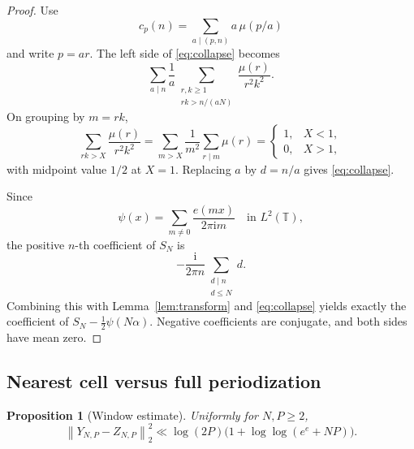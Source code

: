 \documentclass[11pt]{article}
\numberwithin{equation}{section}
\newtheorem{proposition}[theorem]{Proposition}
\theoremstyle{definition}
\newcommand{\T}{\mathbb T}
\newcommand{\1}{\mathbf 1}
\newcommand{\ii}{\mathrm i}
\newcommand{\norm}[1]{\left\lVert#1\right\rVert}
\begin{document}
\begin{proof}
Use
\[
 c_p(n)=\sum_{a\mid(p,n)}a\,\mu(p/a)
\]
and write \(p=ar\).  The left side of \eqref{eq:collapse} becomes
\[
 \sum_{a\mid n}\frac1a
 \sum_{\substack{r,k\ge1\\rk>n/(aN)}}
 \frac{\mu(r)}{r^2k^2}.
\]
On grouping by \(m=rk\),
\[
 \sum_{rk>X}\frac{\mu(r)}{r^2k^2}
 =\sum_{m>X}\frac1{m^2}\sum_{r\mid m}\mu(r)
 =
 \begin{cases}
 1,&X<1,\\
 0,&X>1,
 \end{cases}
\]
with midpoint value \(1/2\) at \(X=1\).  Replacing \(a\) by
\(d=n/a\) gives \eqref{eq:collapse}.

Since
\[
 \psi(x)=\sum_{m\ne0}\frac{e(mx)}{2\pi\ii m}
\quad\text{in }L^2(\T),
\]
the positive \(n\)-th coefficient of \(S_N\) is
\[
 -\frac{\ii}{2\pi n}\sum_{\substack{d\mid n\\d\le N}}d.
\]
Combining this with Lemma~\ref{lem:transform} and
\eqref{eq:collapse} yields exactly the coefficient of
\(S_N-\frac12\psi(N\alpha)\).  Negative coefficients are conjugate,
and both sides have mean zero.
\end{proof}

\subsection{Nearest cell versus full periodization}

\begin{proposition}[Window estimate]\label{prop:window}
Uniformly for \(N,P\ge2\),
\begin{equation}\label{eq:window}
 \norm{Y_{N,P}-Z_{N,P}}_2^2
 \ll \log(2P)\bigl(1+\log\log(e^e+NP)\bigr).
\end{equation}
\end{proposition}
\end{document}
